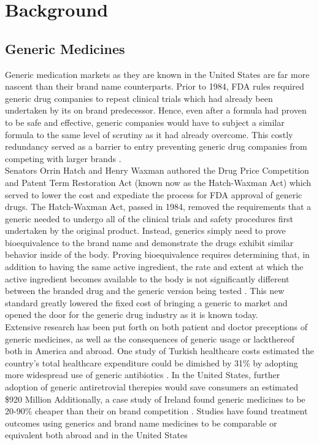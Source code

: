 \chapter{Background}

\section{Generic Medicines}
Generic medication markets as they are known in the United States are far more nascent than their brand name counterparts. Prior to 1984, FDA rules required generic drug companies to repeat clinical trials which had already been undertaken by its on brand predecessor. Hence, even after a formula had proven to be safe and effective, generic companies would have to subject a similar formula to the same level of scrutiny as it had already overcome. This costly redundancy served as a barrier to entry preventing generic drug companies from competing with larger brands \cite{eban_bottle_2019}.\\
\indent Senators Orrin Hatch and Henry Waxman authored the Drug Price Competition and Patent Term Restoration Act (known now as the Hatch-Waxman Act) which served to lower the cost and expediate the process for FDA approval of generic drugs. The Hatch-Waxman Act, passed in 1984, removed the requirements that a generic needed to undergo all of the clinical trials and safety procedures first undertaken by the original product. Instead, generics simply need to prove bioequivalence to the brand name and demonstrate the drugs exhibit similar behavior inside of the body. Proving bioequivalence requires determining that, in addition to having the same active ingredient, the rate and extent at which the active ingredient becomes available to the body is not significantly different between the branded drug and the generic version being tested \cite{fda_primer}. This new standard greatly lowered the fixed cost of bringing a generic to market and opened the door for the generic drug industry as it is known today.\\
\indent Extensive research has been put forth on both patient and doctor preceptions of generic medicines, as well as the consequences of generic usage or lackthereof both in America and abroad. One study of Turkish healthcare costs estimated the country's total healthcare expenditure could be dimished by 31\% by adopting more widespread use of generic antibiotics \cite{mercanoglu_evaluation_2018}. In the United States, further adoption of generic antiretrovial therepies would save consumers an estimated \$920 Million \cite{walensky_economic_2013} Additionally, a case study of Ireland found generic medicines to be 20-90\% cheaper than their on brand competition \cite{dunne_review_2013}. Studies have found treatment outcomes using generics and brand name medicines to be comparable or equivalent both abroad \cite{lin_comparative_2017} and in the United States \cite{desai_comparative_2019}\\
